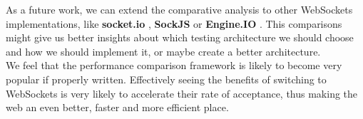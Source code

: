 \documentclass[conference]{IEEEtran}
\begin{document}
As a future work, we can extend the comparative analysis to other WebSockets
implementations, like \textbf{socket.io} \cite{socket.io}, \textbf{SockJS}
\cite{SockJS} or \textbf{Engine.IO} \cite{Engine.IO}. This comparisons might
give us better insights about which testing architecture we should choose and
how we should implement it, or maybe create a better architecture.
\\

We feel that the performance comparison framework is likely to become very popular
if properly written. Effectively seeing the benefits of switching to WebSockets
is very likely to accelerate their rate of acceptance, thus making the web an
even better, faster and more efficient place.

{}

\end{document}
